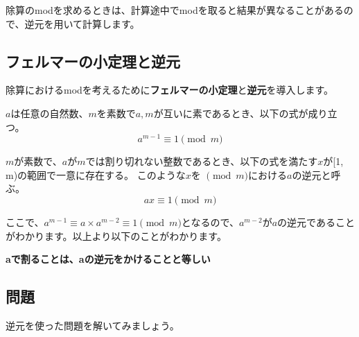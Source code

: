 \documentclass{jlreq}
\begin{document}
除算のmodを求めるときは、計算途中でmodを取ると結果が異なることがあるので、逆元を用いて計算します。

\subsection{フェルマーの小定理と逆元}

除算におけるmodを考えるために\textbf{フェルマーの小定理}と\textbf{逆元}を導入します。

\begin{tcolorbox}[enhanced,title=フェルマーの小定理, 
    attach boxed title to top left, 
    colback=white!95!blue,
    colbacktitle=white!10!blue!50!black,
    drop fuzzy shadow,
    boxrule=0.25mm,
    ]
    $a$は任意の自然数、$m$を素数で$a, m$が互いに素であるとき、以下の式が成り立つ。
    \begin{equation*}
        a^{m-1} \equiv 1 \pmod{m}
    \end{equation*}
  \end{tcolorbox}

\begin{tcolorbox}[enhanced,title=逆元, 
    attach boxed title to top left, 
    colback=white!95!blue,
    colbacktitle=white!10!blue!50!black,
    drop fuzzy shadow,
    boxrule=0.25mm,
    ]
    $m$が素数で、$a$が$m$では割り切れない整数であるとき、以下の式を満たす$x$が[1, m)の範囲で一意に存在する。
    このような$x$を $\pmod m$における$a$の逆元と呼ぶ。
    \begin{equation*}
        a x \equiv 1 \pmod{m}
    \end{equation*}
  \end{tcolorbox}
  ここで、$a^{m-1} \equiv a \times a^{m-2} \equiv 1 \pmod{m}$となるので、$a^{m-2}$が$a$の逆元であることがわかります。以上より以下のことがわかります。

  \vspace{0.5cm}

  \begin{center}
    \textbf{aで割ることは、aの逆元をかけることと等しい}
  \end{center}

\subsection{問題}
逆元を使った問題を解いてみましょう。
\end{document}
